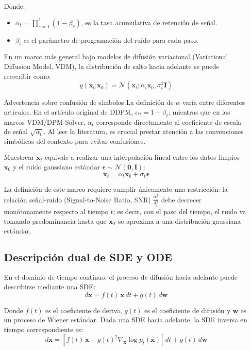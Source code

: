Donde:
\begin{itemize}
    \item $\bar{\alpha}_t = \prod_{s=1}^{t} (1 - \beta_s)$, es la tasa acumulativa de retención de señal.
    \item $\beta_t$ es el parámetro de programación del ruido para cada paso.
\end{itemize}

En un marco más general bajo modelos de difusión variacional (Variational Diffusion Model, VDM), la distribución de salto hacia adelante se puede reescribir como:
$$q(\mathbf{x}_t | \mathbf{x}_0) = \mathcal{N}(\mathbf{x}_t; \alpha_t \mathbf{x}_0, \sigma_t^2 \mathbf{I})$$

\begin{warningbox}{Advertencia sobre confusión de símbolos}
La definición de $\alpha$ varía entre diferentes artículos. En el artículo original de DDPM, $\alpha_t = 1 - \beta_t$; mientras que en los marcos VDM/DPM-Solver, $\alpha_t$ corresponde directamente al coeficiente de escala de señal $\sqrt{\bar{\alpha}_t}$. Al leer la literatura, es crucial prestar atención a las convenciones simbólicas del contexto para evitar confusiones.
\end{warningbox}

Muestrear $\mathbf{x}_t$ equivale a realizar una interpolación lineal entre los datos limpios $\mathbf{x}_0$ y el ruido gaussiano estándar $\boldsymbol{\epsilon} \sim \mathcal{N}(\mathbf{0}, \mathbf{I})$:
$$\mathbf{x}_t = \alpha_t \mathbf{x}_0 + \sigma_t \boldsymbol{\epsilon}$$

La definición de este marco requiere cumplir únicamente una restricción: la relación señal-ruido (Signal-to-Noise Ratio, SNR) $\frac{\alpha_t^2}{\sigma_t^2}$ debe decrecer monótonamente respecto al tiempo $t$; es decir, con el paso del tiempo, el ruido va tomando predominancia hasta que $\mathbf{x}_T$ se aproxima a una distribución gaussiana estándar.

\subsection{Descripción dual de SDE y ODE}

En el dominio de tiempo continuo, el proceso de difusión hacia adelante puede describirse mediante una SDE:
$$d\mathbf{x} = f(t)\, \mathbf{x}\, dt + g(t)\, d\mathbf{w}$$

Donde $f(t)$ es el coeficiente de deriva, $g(t)$ es el coeficiente de difusión y $\mathbf{w}$ es un proceso de Wiener estándar. Dada una SDE hacia adelante, la SDE inversa en tiempo correspondiente es:
$$d\mathbf{x} = \left[f(t)\, \mathbf{x} - g(t)^2 \nabla_{\mathbf{x}} \log p_t(\mathbf{x})\right] dt + g(t)\, d\bar{\mathbf{w}}$$

